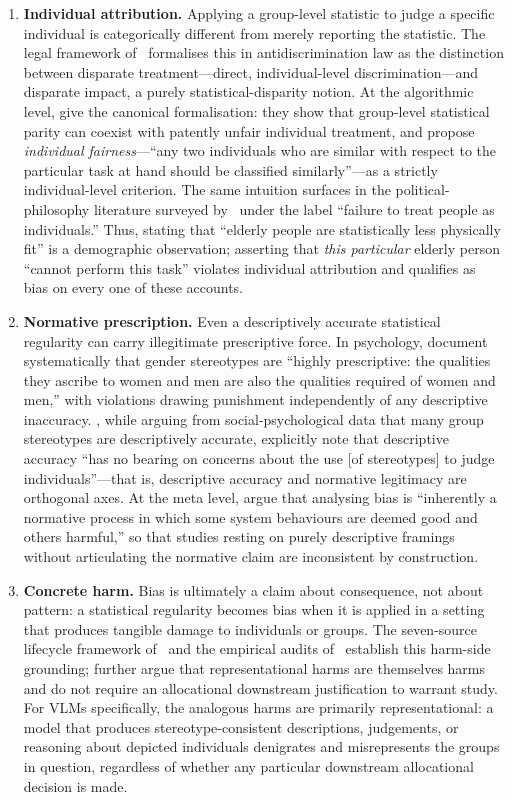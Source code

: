 \documentclass[lettersize,journal]{IEEEtran}
\begin{document}
\begin{enumerate}
    \item \textbf{Individual attribution.} Applying a group-level statistic to judge a specific individual is categorically different from merely reporting the statistic. The legal framework of~\cite{barocas2016big} formalises this in antidiscrimination law as the distinction between disparate treatment---direct, individual-level discrimination---and disparate impact, a purely statistical-disparity notion. At the algorithmic level, \cite{dwork2012fairness} give the canonical formalisation: they show that group-level statistical parity can coexist with patently unfair individual treatment, and propose \emph{individual fairness}---``any two individuals who are similar with respect to the particular task at hand should be classified similarly''---as a strictly individual-level criterion. The same intuition surfaces in the political-philosophy literature surveyed by~\cite{binns2018fairness} under the label ``failure to treat people as individuals.'' Thus, stating that ``elderly people are statistically less physically fit'' is a demographic observation; asserting that \emph{this particular} elderly person ``cannot perform this task'' violates individual attribution and qualifies as bias on every one of these accounts.
    \item \textbf{Normative prescription.} Even a descriptively accurate statistical regularity can carry illegitimate prescriptive force. In psychology, \cite{prentice2002women} document systematically that gender stereotypes are ``highly prescriptive: the qualities they ascribe to women and men are also the qualities required of women and men,'' with violations drawing punishment independently of any descriptive inaccuracy. \cite{jussim2015stereotype}, while arguing from social-psychological data that many group stereotypes are descriptively accurate, explicitly note that descriptive accuracy ``has no bearing on concerns about the use [of stereotypes] to judge individuals''---that is, descriptive accuracy and normative legitimacy are orthogonal axes. At the meta level, \cite{blodgett2020language} argue that analysing bias is ``inherently a normative process in which some system behaviours are deemed good and others harmful,'' so that studies resting on purely descriptive framings without articulating the normative claim are inconsistent by construction.
    \item \textbf{Concrete harm.} Bias is ultimately a claim about consequence, not about pattern: a statistical regularity becomes bias when it is applied in a setting that produces tangible damage to individuals or groups. The seven-source lifecycle framework of~\cite{suresh2021framework} and the empirical audits of~\cite{buolamwini2018gender} establish this harm-side grounding; \cite{blodgett2020language} further argue that representational harms are themselves harms and do not require an allocational downstream justification to warrant study. For VLMs specifically, the analogous harms are primarily representational: a model that produces stereotype-consistent descriptions, judgements, or reasoning about depicted individuals denigrates and misrepresents the groups in question, regardless of whether any particular downstream allocational decision is made.

\end{enumerate}
\end{document}
